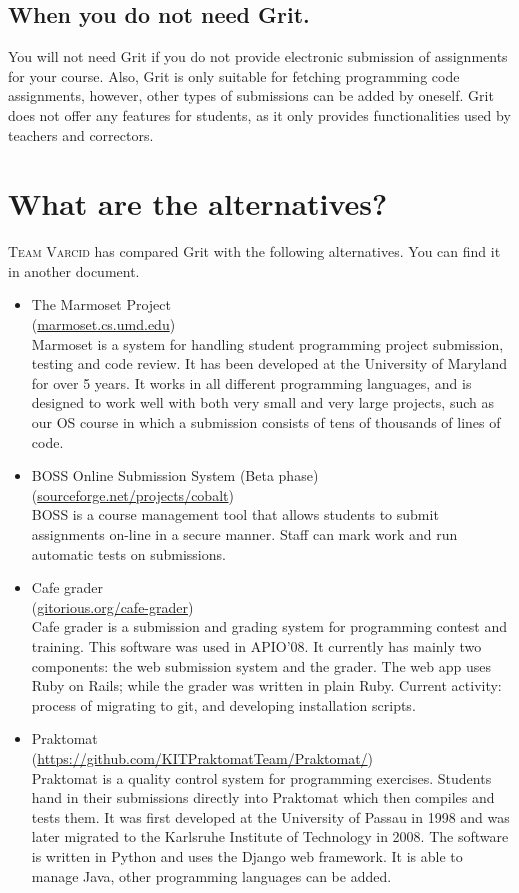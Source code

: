 \documentclass[10pt,a4paper, titlepage, toc=idx]{scrreprt}
\theoremstyle{definition}
\theoremstyle{plain}
\newcommand*{\product}{Grit}
\begin{document}
\subsection*{When you do not need \product.}
You will not need \product{} if you do not provide electronic submission of
assignments for your course. Also, \product{} is only suitable for
fetching programming code assignments, however, other types of
submissions can be added by oneself.  \product{} does not offer any
features for students, as it only provides functionalities used by
teachers and correctors.
\section{What are the alternatives?}
\textsc{Team Varcid} has compared \product{} with the following alternatives. You can find it in another document.
\begin{itemize}
\item The Marmoset Project \\
  (\url{marmoset.cs.umd.edu}) \\
  Marmoset is a system for handling student programming project
  submission, testing and code review. It has been developed at the
  University of Maryland for over 5 years. It works in all different
  programming languages, and is designed to work well with both very
  small and very large projects, such as our OS course in which a
  submission consists of tens of thousands of lines of code.
\item BOSS Online Submission System (Beta phase) \\
  (\url{sourceforge.net/projects/cobalt}) \\
  BOSS is a course management tool that allows students to submit
  assignments on-line in a secure manner. Staff can mark work and run
  automatic tests on submissions.
\item Cafe grader \\
  (\url{gitorious.org/cafe-grader}) \\
  Cafe grader is a submission and grading system for programming
  contest and training.  This software was used in APIO'08. It
  currently has mainly two components: the web submission system and
  the grader. The web app uses Ruby on Rails; while the grader was
  written in plain Ruby. Current activity: process of migrating to
  git, and developing installation scripts.
\item Praktomat \\
  (\url{https://github.com/KITPraktomatTeam/Praktomat/})
  \\
  Praktomat is a quality control system for programming
  exercises. Students hand in their submissions directly into
  Praktomat which then compiles and tests them. It was first developed
  at the University of Passau in 1998 and was later migrated to the
  Karlsruhe Institute of Technology in 2008.  The software is written
  in Python and uses the Django web framework. It is able to manage
  Java, other programming languages can be added.
\end{itemize}
\end{document}
